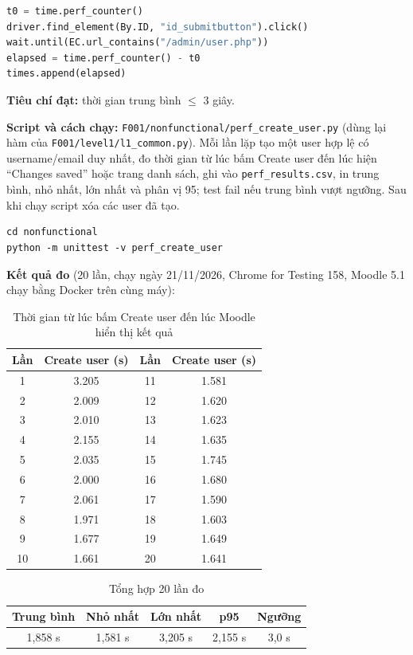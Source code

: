 \documentclass[12pt,a4paper]{article}
\begin{document}
\begin{lstlisting}[language=Python]
t0 = time.perf_counter()
driver.find_element(By.ID, "id_submitbutton").click()
wait.until(EC.url_contains("/admin/user.php"))
elapsed = time.perf_counter() - t0
times.append(elapsed)
\end{lstlisting}
\textbf{Tiêu chí đạt:} thời gian trung bình $\le$ 3 giây.

\textbf{Script và cách chạy:} \texttt{F001/nonfunctional/perf\_create\_user.py} (dùng lại hàm của \texttt{F001/level1/l1\_common.py}). Mỗi lần lặp tạo một user hợp lệ có username/email duy nhất, đo thời gian từ lúc bấm Create user đến lúc hiện ``Changes saved'' hoặc trang danh sách, ghi vào \texttt{perf\_results.csv}, in trung bình, nhỏ nhất, lớn nhất và phân vị 95; test fail nếu trung bình vượt ngưỡng. Sau khi chạy script xóa các user đã tạo.
\begin{lstlisting}
cd nonfunctional
python -m unittest -v perf_create_user
\end{lstlisting}

\textbf{Kết quả đo} (20 lần, chạy ngày 21/11/2026, Chrome for Testing 158, Moodle 5.1 chạy bằng Docker trên cùng máy):

\begin{table}[H]
\centering\small
\begin{tabular}{|c|c|c|c|}
\hline
\rowcolor{gray!15}\textbf{Lần} & \textbf{Create user (s)} & \textbf{Lần} & \textbf{Create user (s)} \\ \hline
1 & 3.205 & 11 & 1.581 \\ \hline
2 & 2.009 & 12 & 1.620 \\ \hline
3 & 2.010 & 13 & 1.623 \\ \hline
4 & 2.155 & 14 & 1.635 \\ \hline
5 & 2.035 & 15 & 1.745 \\ \hline
6 & 2.000 & 16 & 1.680 \\ \hline
7 & 2.061 & 17 & 1.590 \\ \hline
8 & 1.971 & 18 & 1.603 \\ \hline
9 & 1.677 & 19 & 1.649 \\ \hline
10 & 1.661 & 20 & 1.641 \\ \hline
\end{tabular}
\caption{Thời gian từ lúc bấm Create user đến lúc Moodle hiển thị kết quả}
\end{table}

\begin{table}[H]
\centering\small
\begin{tabular}{|c|c|c|c|c|}
\hline
\rowcolor{gray!15}\textbf{Trung bình} & \textbf{Nhỏ nhất} & \textbf{Lớn nhất} & \textbf{p95} & \textbf{Ngưỡng} \\ \hline
1,858 s & 1,581 s & 3,205 s & 2,155 s & 3,0 s \\ \hline
\end{tabular}
\caption{Tổng hợp 20 lần đo}
\end{table}
\end{document}
